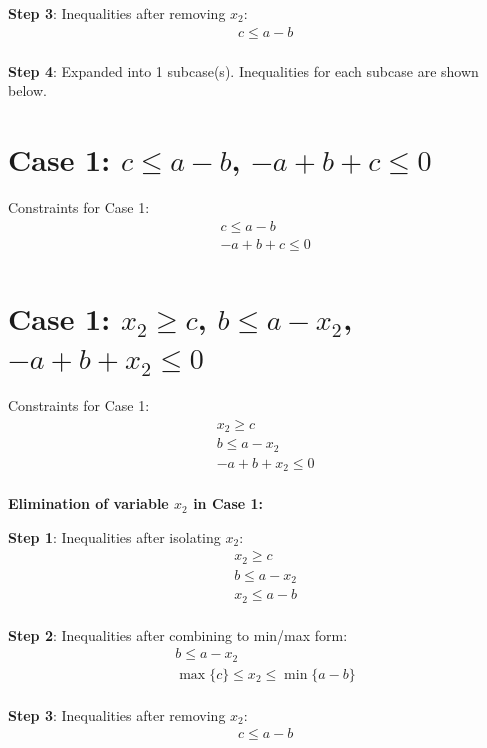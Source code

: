 \documentclass{article}
\begin{document}
\textbf{Step 3}: Inequalities after removing $x_{2}$:
\begin{align}
& c \leq a - b \\
\end{align}

\textbf{Step 4}: Expanded into 1 subcase(s). Inequalities for each subcase are shown below.

\section{Case 1: $c \leq a - b$, $- a + b + c \leq 0$}

Constraints for Case 1:
\begin{align}
& c \leq a - b \\
& - a + b + c \leq 0 \\
\end{align}

\section{Case 1: $x_{2} \geq c$, $b \leq a - x_{2}$, $- a + b + x_{2} \leq 0$}

Constraints for Case 1:
\begin{align}
& x_{2} \geq c \\
& b \leq a - x_{2} \\
& - a + b + x_{2} \leq 0 \\
\end{align}

\textbf{Elimination of variable $x_{2}$ in Case 1:}

\textbf{Step 1}: Inequalities after isolating $x_{2}$:
\begin{align}
& x_{2} \geq c \\
& b \leq a - x_{2} \\
& x_{2} \leq a - b \\
\end{align}

\textbf{Step 2}: Inequalities after combining to min/max form:
\begin{align}
& b \leq a - x_{2} \\
& \max\{c\} \leq x_{2} \leq \min\{a - b\} \\
\end{align}

\textbf{Step 3}: Inequalities after removing $x_{2}$:
\begin{align}
& c \leq a - b \\
\end{align}
\end{document}
